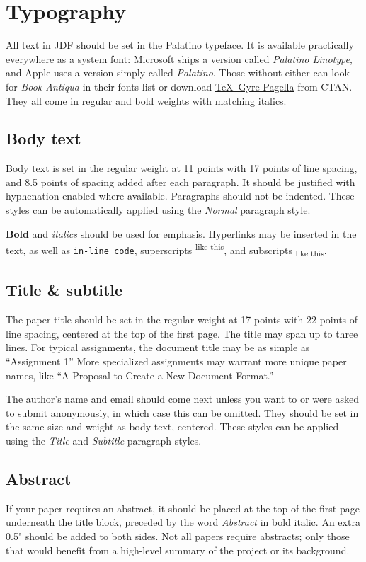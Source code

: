 \documentclass[
	letterpaper, %
]{jdf}
\begin{document}
\section{Typography}
All text in JDF should be set in the Palatino typeface. It is available practically everywhere as a system font: Microsoft ships a version called \emph{Palatino Linotype}, and Apple uses a version simply called \emph{Palatino}. Those without either can look for \emph{Book Antiqua} in their fonts list or download \href{https://www.ctan.org/tex-archive/fonts/tex-gyre/opentype}{\TeX\ Gyre Pagella} from CTAN. They all come in regular and bold weights with matching italics.

\subsection{Body text}
Body text is set in the regular weight at 11 points with 17 points of line spacing, and 8.5 points of spacing added after each paragraph. It should be justified with hyphenation enabled where available. Paragraphs should not be indented. These styles can be automatically applied using the \emph{Normal} paragraph style.

\textbf{Bold} and \textit{italics} should be used for emphasis. Hyperlinks may be inserted in the text, as well as {\tt in-line code}, superscripts\textsuperscript{ like this}, and subscripts\textsubscript{ like this}.

\subsection{Title \& subtitle}
The paper title should be set in the regular weight at 17 points with 22 points of line spacing, centered at the top of the first page. The title may span up to three lines. For typical assignments, the document title may be as simple as “Assignment 1” More specialized assignments may warrant more unique paper names, like “A Proposal to Create a New Document Format.”

The author’s name and email should come next unless you want to or were asked to submit anonymously, in which case this can be omitted. They should be set in the same size and weight as body text, centered. These styles can be applied using the \emph{Title} and \emph{Subtitle} paragraph styles.

\subsection{Abstract}
If your paper requires an abstract, it should be placed at the top of the first page underneath the title block, preceded by the word \emph{Abstract} in bold italic. An extra 0.5" should be added to both sides. Not all papers require abstracts; only those that would benefit from a high-level summary of the project or its background.
\end{document}
